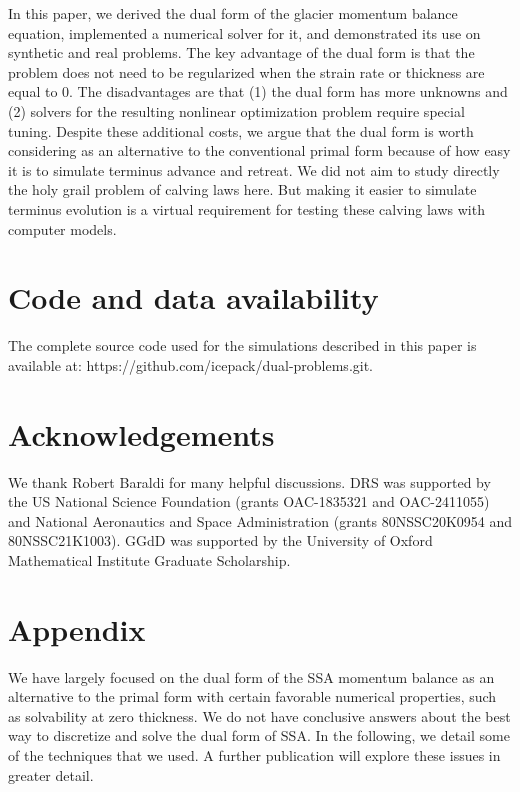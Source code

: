 \documentclass[review,oneside]{igs}
\begin{document}
In this paper, we derived the dual form of the glacier momentum balance equation, implemented a numerical solver for it, and demonstrated its use on synthetic and real problems.
The key advantage of the dual form is that the problem does not need to be regularized when the strain rate or thickness are equal to 0.
The disadvantages are that (1) the dual form has more unknowns and (2) solvers for the resulting nonlinear optimization problem require special tuning.
Despite these additional costs, we argue that the dual form is worth considering as an alternative to the conventional primal form because of how easy it is to simulate terminus advance and retreat.
We did not aim to study directly the holy grail problem of calving laws here.
But making it easier to simulate terminus evolution is a virtual requirement for testing these calving laws with computer models.



\section{Code and data availability}

The complete source code used for the simulations described in this paper is available at: https://github.com/icepack/dual-problems.git.



\section{Acknowledgements}

We thank Robert Baraldi for many helpful discussions.
DRS was supported by the US National Science Foundation (grants OAC-1835321 and OAC-2411055) and National Aeronautics and Space Administration (grants 80NSSC20K0954 and 80NSSC21K1003).
GGdD was supported by the University of Oxford Mathematical Institute Graduate Scholarship.




\pagebreak



\appendix\section{Appendix}

We have largely focused on the dual form of the SSA momentum balance as an alternative to the primal form with certain favorable numerical properties, such as solvability at zero thickness.
We do not have conclusive answers about the best way to discretize and solve the dual form of SSA.
In the following, we detail some of the techniques that we used.
A further publication will explore these issues in greater detail.
\end{document}
